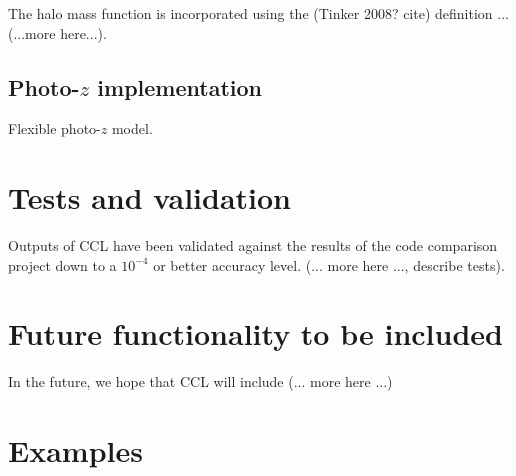 \documentclass[\docopts]{\docclass}
\begin{document}
The halo mass function is incorporated using the (Tinker 2008? cite) definition ... (...more here...).

\subsection{Photo-$z$ implementation}
\label{sec:photoz}

Flexible photo-$z$ model.

\section{Tests and validation}
\label{sec:tests}

Outputs of CCL have been validated against the results of the code comparison project down to a $10^{-4}$ or better accuracy level. (... more here ..., describe tests).

\section{Future functionality to be included}

In the future, we hope that CCL will include (... more here ...)

\section{Examples}
\label{sec:example}





\end{document}
